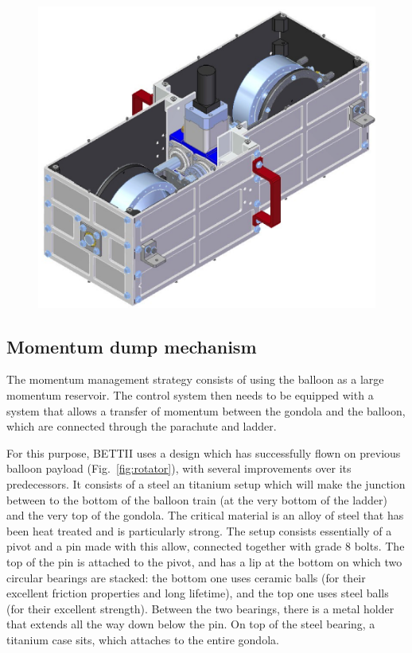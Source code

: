 \begin{figure}[!ht]
	\centering
	\includegraphics[width=\textwidth]{Figures/CCMG-case.png}
	\caption{}
	\label{fig:CCMGcase}
    \end{figure}


\subsection{Momentum dump mechanism}
\label{subsec:chap3momdumpmotor}

The momentum management strategy consists of using the balloon as a large momentum reservoir. The control system then needs to be equipped with a system that allows a transfer of momentum between the gondola and the balloon, which are connected through the parachute and ladder. 

For this purpose, BETTII uses a design which has successfully flown on previous balloon payload (Fig.~\ref{fig:rotator}), with several improvements over its predecessors. It consists of a steel an titanium setup which will make the junction between to the bottom of the balloon train (at the very bottom of the ladder) and the very top of the gondola. The critical material is an alloy of steel that has been heat treated and is particularly strong. The setup consists essentially of a pivot and a pin made with this allow, connected together with grade 8 bolts. The top of the pin is attached to the pivot, and has a lip at the bottom on which two circular bearings are stacked: the bottom one uses ceramic balls (for their excellent friction properties and long lifetime), and the top one uses steel balls (for their excellent strength). Between the two bearings, there is a metal holder that extends all the way down below the pin. On top of the steel bearing, a titanium case sits, which attaches to the entire gondola. 

